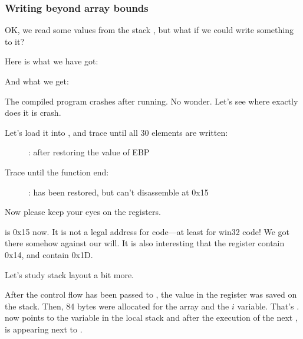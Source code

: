 \subsubsection{Writing beyond array bounds}

OK, we read some values from the stack , but what if we could write something to it?

Here is what we have got:




And what we get:



The compiled program crashes after running. No wonder. Let's see where exactly does it is crash.

\clearpage
\myindex{\olly}

Let's load it into \olly, and trace until all 30 elements are written:

\begin{figure}[H]
\centering
{}
\caption{\olly: after restoring the value of EBP}
\label{fig:array_BO_olly_w1}
\end{figure}

\clearpage
Trace until the function end:

\begin{figure}[H]
\centering
{}
\caption{\olly: 
 has been restored, but \olly can't disassemble at 0x15}
\label{fig:array_BO_olly_w2}
\end{figure}

Now please keep your eyes on the registers.

\EIP is 0x15 now. It is not a legal address for code---at least for win32 code!
We got there somehow against our will.
It is also interesting that the \EBP register contain 0x14,
\ECX and \EDX contain 0x1D.

Let's study stack layout a bit more.

After the control flow has been passed to \TT{\main}, the value in the \EBP register was saved on the stack.
Then, 84 bytes were allocated for the array and the $i$ variable.
That's .
\ESP now points to the  variable in the local stack and after the execution of 
the next ,  is appearing next to .

